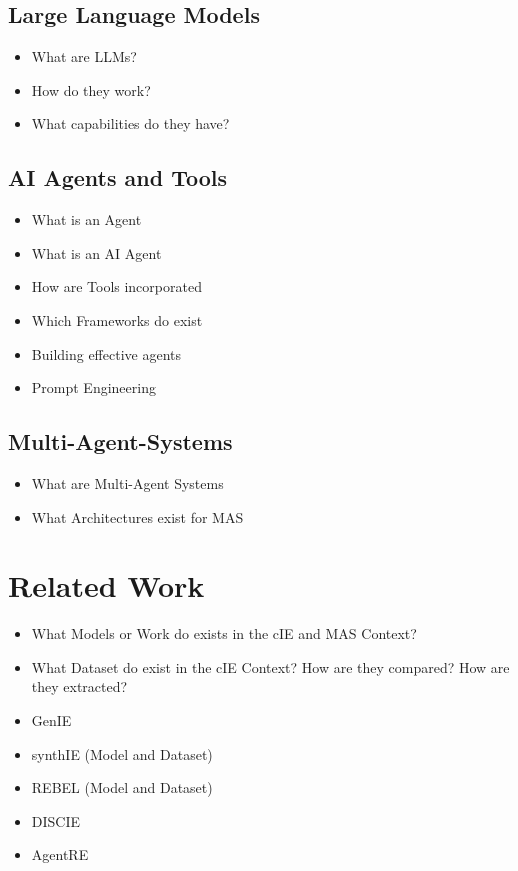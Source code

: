 \documentclass[a4paper,oneside,bibliography=totoc]{scrbook}
\begin{document}
\section{Large Language Models}
\begin{itemize}
  \item What are LLMs?
  \item How do they work?
  \item What capabilities do they have?
\end{itemize}
\section{AI Agents and Tools}
\begin{itemize}
  \item What is an Agent
  \item What is an AI Agent
  \item How are Tools incorporated
  \item Which Frameworks do exist
  \item Building effective agents \cite{Anthropic2024}
  \item Prompt Engineering \cite{Schulhoff2025}
\end{itemize}
\section{Multi-Agent-Systems}
\begin{itemize}
  \item What are Multi-Agent Systems
  \item What Architectures exist for MAS
\end{itemize}

\chapter{Related Work}
\begin{itemize}
  \item What Models or Work do exists in the cIE and MAS Context?
  \item What Dataset do exist in the cIE Context? How are they compared? How are they extracted?
  \item GenIE \cite{Josifoski2021}
  \item synthIE (Model and Dataset) \cite{Josifoski2023}
  \item REBEL (Model and Dataset) \cite{HuguetCabot2021}
  \item DISCIE \cite{Moeller2024}
  \item AgentRE \cite{Shi2024}
\end{itemize}
\end{document}
